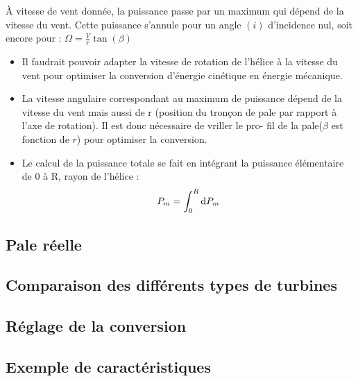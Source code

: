 \documentclass[main.tex]{subfiles}
\begin{document}
À vitesse de vent donnée, la puissance passe par un maximum qui dépend de la vitesse du vent. Cette puissance s’annule pour un angle $(i)$ d’incidence nul, soit encore pour :  $\Omega=\frac{V}{r}\tan(\beta)$
\begin{rem}
\begin{itemize}
\item Il faudrait pouvoir adapter la vitesse de rotation de l’hélice à la vitesse du vent pour optimiser la conversion d’énergie cinétique en énergie mécanique.
\item La vitesse angulaire correspondant au maximum de
puissance dépend de la vitesse du vent mais aussi
de r (position du tronçon de pale par rapport à l’axe
de rotation). Il est donc nécessaire de vriller le pro-
fil de la pale($\beta$ est fonction de $r$) pour optimiser la
conversion.
\item Le calcul de la puissance totale se fait en
intégrant la puissance élémentaire de 0 à R, rayon
de l’hélice :
\[
P_m = \int_{0}^{R}\mbox{d} P_m
\]
\end{itemize}
\end{rem}
\subsection{Pale réelle}
\subsection{Comparaison des différents types de turbines}
\subsection{Réglage de la conversion}
\subsection{Exemple de caractéristiques}
\end{document}
